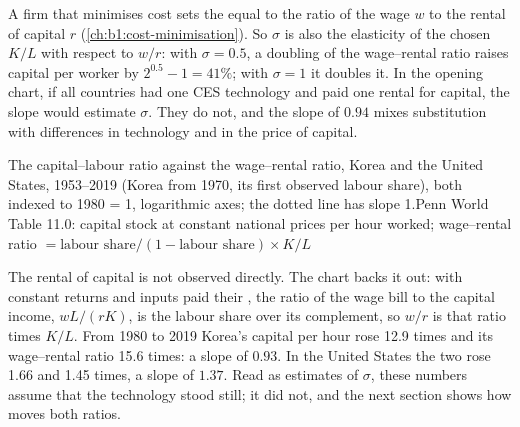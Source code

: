 A firm that minimises cost sets the  equal to the ratio of the wage $w$
to the rental of capital $r$ (\cref{ch:b1:cost-minimisation}). So $\sigma$ is
also the elasticity of the chosen $K/L$ with respect to $w/r$: with
$\sigma = 0.5$, a doubling of the wage--rental ratio raises capital per worker
by $2^{0.5} - 1 = 41\%$; with $\sigma = 1$ it doubles it. In the opening chart,
if all countries had one CES technology and paid one rental for capital,
the slope would estimate $\sigma$. They do not, and the slope of $0.94$ mixes
substitution with differences in technology and in the price of capital.

\begin{omchart}{The capital--labour ratio against the wage--rental ratio,
Korea and the United States, 1953--2019 (Korea from 1970, its first observed
labour share), both indexed to 1980 = 1,
logarithmic axes; the dotted line has slope 1.}{Penn World Table 11.0:
capital stock at constant national prices per hour worked; wage--rental
ratio $= \text{labour share}/(1 - \text{labour share}) \times K/L$}
\end{omchart}

The rental of capital is not observed directly. The chart backs it out:
with constant returns and inputs paid their , the ratio
of the wage bill to the capital income, $wL/(rK)$, is the labour share over
its complement, so $w/r$ is that ratio times $K/L$. From 1980 to 2019 Korea's
capital per hour rose 12.9 times and its wage--rental ratio 15.6 times: a
slope of $0.93$. In the United States the two rose 1.66 and 1.45 times, a
slope of $1.37$. %
Read as estimates of $\sigma$, these numbers assume that the technology stood
still; it did not, and the next section shows how  moves
both ratios.


